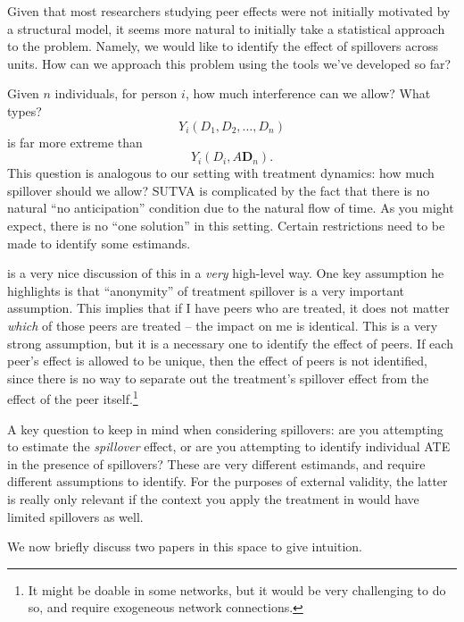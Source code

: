 \documentclass{tufte-handout}
\theoremstyle{break}
\begin{document}
Given that most researchers studying peer effects were not initially motivated by a structural model, it seems more natural to initially take a statistical approach to the problem. Namely, we would like to identify the effect of spillovers across units. How can we approach this problem using the tools we've developed so far?

Given $n$ individuals, for person $i$, how much interference can we allow? What types? 
    \begin{equation*}
      Y_{i}(D_{1}, D_{2}, \ldots, D_{n})
    \end{equation*}
    is far more extreme than
    \begin{equation*}
      Y_{i}(D_{i}, A\mathbf{D}_{n}).
    \end{equation*}
This question is analogous to our setting with treatment dynamics: how much spillover should we allow? SUTVA is complicated by the fact that there is no natural ``no anticipation'' condition due to the natural flow of time. As you might expect, there is no ``one solution'' in this setting. Certain restrictions need to be made to identify some estimands.

\citet{manski2013identification} is a very nice discussion of this in a \emph{very} high-level way. One key assumption he highlights is that ``anonymity'' of treatment spillover is a very important assumption. This implies that if I have peers who are treated, it does not matter \emph{which} of those peers are treated -- the impact on me is identical. This is a very strong assumption, but it is a necessary one to identify the effect of peers. If each peer's effect is allowed to be unique, then the effect of peers is not identified, since there is no way to separate out the treatment's spillover effect from the effect of the peer itself.\footnote{It might be doable in some networks, but it would be very challenging to do so, and require exogeneous network connections.}

A key question to keep in mind when considering spillovers: are you attempting to estimate the \emph{spillover} effect, or are you attempting to identify individual ATE in the presence of spillovers? These are very different estimands, and require different assumptions to identify. For the purposes of external validity, the latter is really only relevant if the context you apply the treatment in would have limited spillovers as well. 

We now briefly discuss two papers in this space to give intuition.
\end{document}
